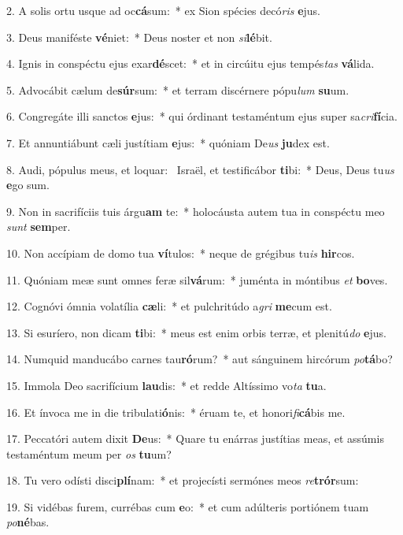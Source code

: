 2. A solis ortu usque ad oc\textbf{cá}sum:~*  ex Sion spécies decó\textit{ris} \textbf{e}jus.\

3. Deus maniféste \textbf{vé}niet:~*  Deus noster et non \textit{si}\textbf{lé}bit.\

4. Ignis in conspéctu ejus exar\textbf{dé}scet:~*  et in circúitu ejus tempés\textit{tas} \textbf{vá}lida.\

5. Advocábit cælum de\textbf{súr}sum:~*  et terram discérnere pópu\textit{lum} \textbf{su}um.\

6. Congregáte illi sanctos \textbf{e}jus:~*  qui órdinant testaméntum ejus super sa\textit{cri}\textbf{fí}cia.\

7. Et annuntiábunt cæli justítiam \textbf{e}jus:~*  quóniam De\textit{us} \textbf{ju}dex est.\

8. Audi, pópulus meus, et loquar: \dag\  Israël, et testificábor \textbf{ti}bi:~*  Deus, Deus tu\textit{us} \textbf{e}go sum.\

9. Non in sacrifíciis tuis árgu\textbf{am} te:~*  holocáusta autem tua in conspéctu meo \textit{sunt} \textbf{sem}per.\

10. Non accípiam de domo tua \textbf{ví}tulos:~*  neque de grégibus tu\textit{is} \textbf{hir}cos.\

11. Quóniam meæ sunt omnes feræ sil\textbf{vá}rum:~*  juménta in móntibus \textit{et} \textbf{bo}ves.\

12. Cognóvi ómnia volatília \textbf{cæ}li:~*  et pulchritúdo a\textit{gri} \textbf{me}cum est.\

13. Si esuríero, non dicam \textbf{ti}bi:~*  meus est enim orbis terræ, et plenitú\textit{do} \textbf{e}jus.\

14. Numquid manducábo carnes tau\textbf{ró}rum?~*  aut sánguinem hircórum \textit{po}\textbf{tá}bo?\

15. Immola Deo sacrifícium \textbf{lau}dis:~*  et redde Altíssimo vo\textit{ta} \textbf{tu}a.\

16. Et ínvoca me in die tribulati\textbf{ó}nis:~*  éruam te, et honori\textit{fi}\textbf{cá}bis me.\

17. Peccatóri autem dixit \textbf{De}us:~*  Quare tu enárras justítias meas, et assúmis testaméntum meum per \textit{os} \textbf{tu}um?\

18. Tu vero odísti disci\textbf{plí}nam:~*  et projecísti sermónes meos \textit{re}\textbf{trór}sum:\

19. Si vidébas furem, currébas cum \textbf{e}o:~*  et cum adúlteris portiónem tuam \textit{po}\textbf{né}bas.\

